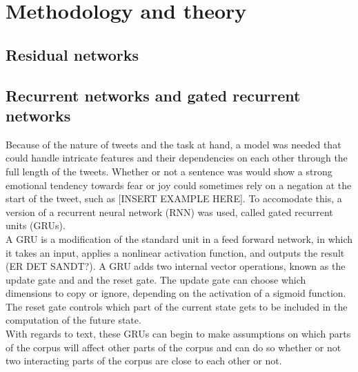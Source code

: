 
\section{Methodology and theory}

\subsection{Residual networks}

\subsection{Recurrent networks and gated recurrent networks}
Because of the nature of tweets and the task at hand, a model was needed that could handle intricate features and their dependencies on each other through the full length of the tweets. Whether or not a sentence was would show a strong emotional tendency towards fear or joy could sometimes rely on a negation at the start of the tweet, such as  [INSERT EXAMPLE HERE]. To accomodate this, a version of a recurrent neural network (RNN) was used, called gated recurrent units (GRUs).\\
A GRU is a modification of the standard unit in a feed forward network, in which it takes an input, applies a nonlinear activation function, and outputs the result (ER DET SANDT?). A GRU adds two internal vector operations, known as the update gate and and the reset gate. The update gate can choose which dimensions to copy or ignore, depending on the activation of a sigmoid function. The reset gate controls which part of the current state gets to be included in the computation of the future state.\\
With regards to text, these GRUs can begin to make assumptions on which parts of the corpus will affect other parts of the corpus and can do so whether or not two interacting parts of the corpus are close to each other or not. 